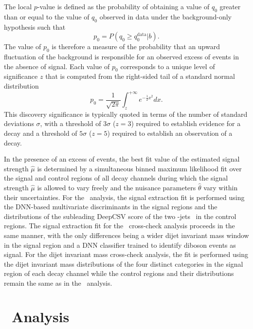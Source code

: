 The local $p$-value is defined as the probability of obtaining a value of $q_{0}$ greater than or equal to the value of $q_{0}$ observed in data under the background-only hypothesis such that
\begin{equation}
  p_{0} = P\left( q_{0} \geq q_{0}^{\textrm{data}} | b \right).
  \label{eq:localpvalue}
\end{equation}
The value of $p_{0}$ is therefore a measure of the probability that an upward fluctuation of the background is responsible for an observed excess of events in the absence of signal. Each value of $p_{0}$ corresponds to a unique level of significance $z$ that is computed from the right-sided tail of a standard normal distribution
\begin{equation}
  p_{0} = \frac{1}{\sqrt{2\pi}} \int_{z}^{+\infty} e^{-\frac{1}{2} x^{2}} dx.
  \label{eq:zscore}
\end{equation}
This discovery significance is typically quoted in terms of the number of standard deviations $\sigma$, with a threshold of $3\sigma$ ($z = 3$) required to establish evidence for a decay and a threshold of $5\sigma$ ($z = 5$) required to establish an observation of a decay.

In the presence of an excess of events, the best fit value of the estimated signal strength $\hat{\mu}$ is determined by a simultaneous binned maximum likelihood fit over the signal and control regions of all decay channels during which the signal strength $\hat{\mu}$ is allowed to vary freely and the nuisance parameters $\hat{\theta}$ vary within their uncertainties. For the \VHbb\ analysis, the signal extraction fit is performed using the DNN-based multivariate discriminants in the signal regions and the distributions of the subleading DeepCSV score of the two \qrkb-jets \btagmin\ in the control regions. The signal extraction fit for the \VZbb\ cross-check analysis proceeds in the same manner, with the only differences being a wider dijet invariant mass window in the signal region and a DNN classifier trained to identify diboson events as signal. For the dijet invariant mass cross-check analysis, the fit is performed using the dijet invariant mass distributions of the four distinct categories in the signal region of each decay channel while the control regions and their distributions remain the same as in the \VHbb\ analysis.

\section{\VZbb\ Analysis}

